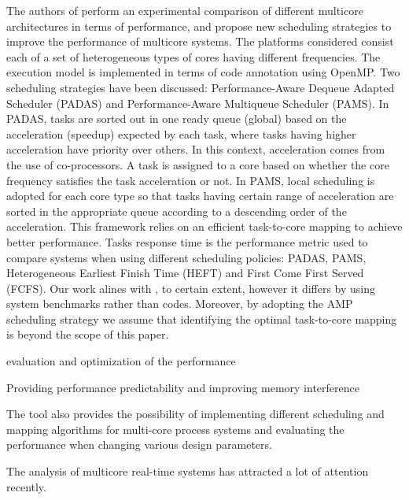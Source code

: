 The authors of \cite{DBLP:journals/corr/TeodoroKAKFS15} perform an experimental comparison of different multicore architectures in terms of performance, and propose new scheduling strategies to improve the performance of multicore systems. The platforms considered consist each of a set of heterogeneous types of cores having different frequencies. The execution model is implemented in terms of code annotation using OpenMP. Two scheduling strategies have been discussed: Performance-Aware Dequeue Adapted Scheduler (PADAS) and Performance-Aware Multiqueue Scheduler (PAMS). In PADAS, tasks are sorted out in one ready queue (global) based on the acceleration (speedup) expected by each task, where tasks having higher acceleration have priority over others. In this context, acceleration comes from the use of co-processors. A task is assigned to a core based on whether the core frequency satisfies the task acceleration or not. In PAMS, local scheduling is adopted for each core type so that tasks having certain range of acceleration are sorted in the appropriate queue according to a descending order of the acceleration. This framework relies on an efficient task-to-core mapping to achieve better performance. Tasks response time is the performance metric used to compare systems when using different scheduling policies: PADAS, PAMS, Heterogeneous Earliest Finish Time (HEFT) and First Come First Served (FCFS).  
%
Our work alines with \cite{DBLP:journals/corr/TeodoroKAKFS15}, to certain extent, however it differs by using system benchmarks rather than codes. Moreover, by adopting the AMP scheduling strategy we assume that identifying the optimal task-to-core mapping is beyond the scope of this paper.

\cite{5762713} evaluation and optimization of the performance

\cite{Subramanian13} Providing performance predictability and improving memory interference 

\cite{SHARMA2014544} The tool also provides the possibility of implementing different scheduling and mapping algorithms for multi-core process systems and evaluating the performance when changing various design parameters.


The analysis of multicore real-time systems has attracted a lot of attention recently. 

